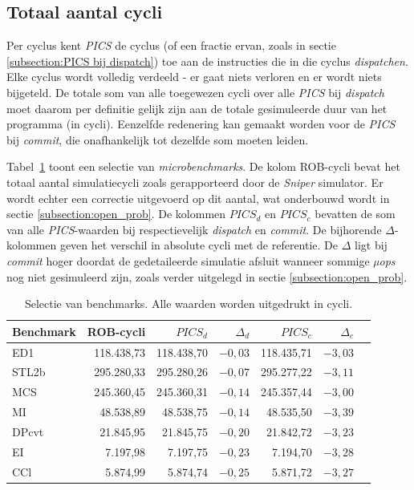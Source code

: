 \documentclass[12pt,a4paper,faculty=ea,language=nl]{ugent-doc}
\begin{document}
\subsection{Totaal aantal cycli}
Per cyclus kent \textit{PICS} de cyclus (of een fractie ervan, zoals in sectie \ref{subsection:PICS bij dispatch}) toe aan de instructies die in die cyclus \textit{dispatchen}. Elke cyclus wordt volledig verdeeld - er gaat niets verloren en er wordt niets bijgeteld. De totale som van alle toegewezen cycli over alle \textit{PICS} bij \textit{dispatch} moet daarom per definitie gelijk zijn aan de totale gesimuleerde duur van het programma (in cycli). Eenzelfde redenering kan gemaakt worden voor de \textit{PICS} bij \textit{commit}, die onafhankelijk tot dezelfde som moeten leiden.

Tabel~\ref{tab:invariant_totaal} toont een selectie van \textit{microbenchmarks}. De kolom ROB-cycli bevat het totaal aantal simulatiecycli zoals gerapporteerd door de \textit{Sniper} simulator. Er wordt echter een correctie uitgevoerd op dit aantal, wat onderbouwd wordt in sectie \ref{subsection:open_prob}. De kolommen \textit{\(PICS_d\)} en \textit{\(PICS_c\)} bevatten de som van alle \textit{PICS}-waarden bij respectievelijk \textit{dispatch} en \textit{commit}. De bijhorende \(\Delta\)-kolommen geven het verschil in absolute cycli met de referentie. De \(\Delta\) ligt bij \textit{commit} hoger doordat de gedetaileerde simulatie afsluit wanneer sommige \textit{µops} nog niet gesimuleerd zijn, zoals verder uitgelegd in sectie \ref{subsection:open_prob}.

\begin{table}[H]
    \centering
    \begin{tabular}{lrrrrrr}
        \hline
        Benchmark & ROB-cycli & \(PICS_d\) & \(\Delta_d\) & \(PICS_c\) & \(\Delta_c\) \\
        \hline
        ED1   & 118.438,73 & 118.438,70 & \(-0,03\) & 118.435,71 & \(-3,03\) \\
        STL2b & 295.280,33 & 295.280,26 & \(-0,07\) & 295.277,22 & \(-3,11\) \\
        MCS   & 245.360,45 & 245.360,31 & \(-0,14\) & 245.357,44 & \(-3,00\) \\
        MI    &  48.538,89 &  48.538,75 & \(-0,14\) &  48.535,50 & \(-3,39\) \\
        DPcvt &  21.845,95 &  21.845,75 & \(-0,20\) &  21.842,72 & \(-3,23\) \\
        EI    &   7.197,98 &   7.197,75 & \(-0,23\) &   7.194,70 & \(-3,28\) \\
        CCl   &   5.874,99 &   5.874,74 & \(-0,25\) &   5.871,72 & \(-3,27\) \\
        \hline
    \end{tabular}
    \caption{Selectie van benchmarks. Alle waarden worden uitgedrukt in cycli.}
    \label{tab:invariant_totaal}
\end{table}
\end{document}
